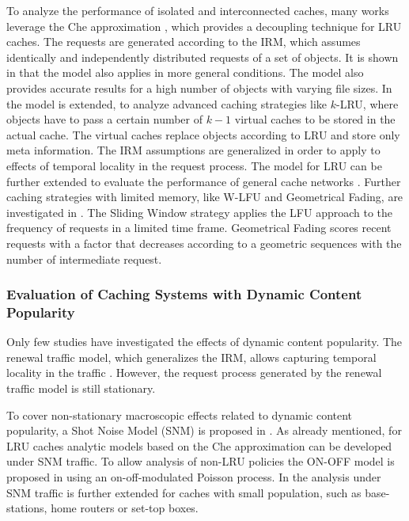 To analyze the performance of isolated and interconnected caches, many works leverage the Che approximation \cite{che2002hierarchical}, which provides a decoupling technique for LRU caches.
The requests are generated according to the IRM, which assumes identically and independently distributed requests of a set of objects.
It is shown in \cite{fricker2012versatile, fricker2012impact} that the model also applies in more general conditions.
The model also provides accurate results for a high number of objects with varying file sizes.
In \cite{martina2014unified} the model is extended, to analyze advanced caching strategies like {$k$-LRU}, where objects have to pass a certain number of $k-1$ virtual caches to be stored in the actual cache.
The virtual caches replace objects according to LRU and store only meta information.
The IRM assumptions are generalized in order to apply to effects of temporal locality in the request process.
The model for LRU can be further extended to evaluate the performance of general cache networks \cite{rosensweig2010approximate, martina2014unified}.
Further caching strategies with limited memory, like W-LFU and Geometrical Fading, are investigated in \cite{hasslinger2014caching}.
The Sliding Window strategy applies the LFU approach to the frequency of requests in a limited time frame.
Geometrical Fading scores recent requests with a factor that decreases according to a geometric sequences with the number of intermediate request.

\subsubsection{Evaluation of Caching Systems with Dynamic Content Popularity}

Only few studies have investigated the effects of dynamic content popularity.
The renewal traffic model, which generalizes the IRM, allows capturing temporal locality in the traffic \cite{martina2014unified}.
However, the request process generated by the renewal traffic model is still stationary.

To cover non-stationary macroscopic effects related to dynamic content popularity, a Shot Noise Model (SNM) is proposed in \cite{traverso2013temporal}. As already mentioned, for LRU caches analytic models based on the Che approximation can be developed under SNM traffic.
To allow analysis of non-LRU policies the ON-OFF model is proposed in \cite{garetto2014dynamic} using an on-off-modulated Poisson process.
In \cite{leconte2016dynamic} the analysis under SNM traffic is further extended for caches with small population, such as base-stations, home routers or set-top boxes.

